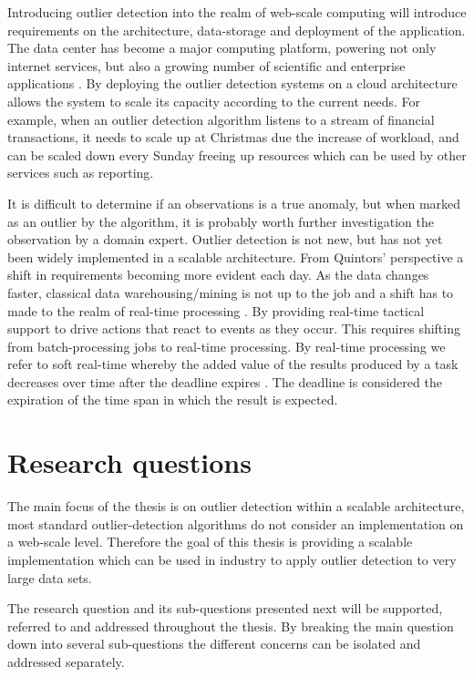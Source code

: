 Introducing outlier detection into the realm of web-scale computing will introduce requirements on the architecture, data-storage and deployment of the application. The data center has become a major computing platform, powering not only internet services, but also a growing number of scientific and enterprise applications \cite{Zaharia:2011:DNO:2170444.2170461}. By deploying the outlier detection systems on a cloud architecture allows the system to scale its capacity according to the current needs. For example, when an outlier detection algorithm listens to a stream of financial transactions, it needs to scale up at Christmas due the increase of workload, and can be scaled down every Sunday freeing up resources which can be used by other services such as reporting.

It is difficult to determine if an observations is a true anomaly, but when marked as an outlier by the algorithm, it is probably worth further investigation the observation by a domain expert. Outlier detection is not new, but has not yet been widely implemented in a scalable architecture. From Quintors' perspective a shift in requirements becoming more evident each day. As the data changes faster, classical data warehousing/mining is not up to the job and a shift has to made to the realm of real-time processing \cite{1640284}. By providing real-time tactical support to drive actions that react to events as they occur. This requires shifting from batch-processing jobs to real-time processing. By real-time processing we refer to soft real-time whereby the added value of the results produced by a task decreases over time after the deadline expires \cite{259423}. The deadline is considered the expiration of the time span in which the result is expected.

\section{Research questions \label{sec1-researchquestions}}

The main focus of the thesis is on outlier detection within a scalable architecture, most standard outlier-detection algorithms do not consider an implementation on a web-scale level. Therefore the goal of this thesis is providing a scalable implementation which can be used in industry to apply outlier detection to very large data sets.

The research question and its sub-questions presented next will be supported, referred to and addressed throughout the thesis. By breaking the main question down into several sub-questions the different concerns can be isolated and addressed separately.

